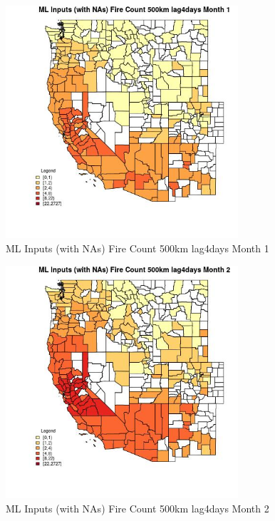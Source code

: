 \begin{figure} 
\centering  
\includegraphics[width=0.77\textwidth]{Code_Outputs/Report_ML_input_PM25_Step4_part_f_de_duplicated_aves_prioritize_24hr_obswNAs_CountyFire_Count_500km_lag4daysmedianMonth1.jpg} 
\caption{\label{fig:Report_ML_input_PM25_Step4_part_f_de_duplicated_aves_prioritize_24hr_obswNAsCountyFire_Count_500km_lag4daysmedianMonth1}ML Inputs (with NAs) Fire Count 500km lag4days Month 1} 
\end{figure} 
 

\begin{figure} 
\centering  
\includegraphics[width=0.77\textwidth]{Code_Outputs/Report_ML_input_PM25_Step4_part_f_de_duplicated_aves_prioritize_24hr_obswNAs_CountyFire_Count_500km_lag4daysmedianMonth2.jpg} 
\caption{\label{fig:Report_ML_input_PM25_Step4_part_f_de_duplicated_aves_prioritize_24hr_obswNAsCountyFire_Count_500km_lag4daysmedianMonth2}ML Inputs (with NAs) Fire Count 500km lag4days Month 2} 
\end{figure} 
 


